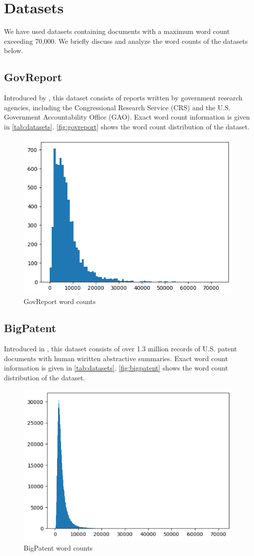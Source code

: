 \section{Datasets}
\label{sec:datasets}

We have used datasets containing documents with a maximum word count exceeding 70,000.
We briefly discuss and analyze the word counts of the datasets below.


\subsection*{GovReport}

Introduced by \citet{huang-etal-2021-efficient}, this dataset consists of reports written
by government research agencies, including the Congressional Research Service (CRS) and
the U.S. Government Accountability Office (GAO).
Exact word count information is given in \autoref{tab:datasets}.
\autoref{fig:govreport} shows the word count distribution of the dataset.

\begin{figure}[!ht]
	\centering
	\includegraphics[width=.48\textwidth]{Images/govreport-wordcount.png}
	\caption{GovReport word counts}
	\label{fig:govreport}
\end{figure}


\subsection*{BigPatent}

Introduced in \citet{sharma-etal-2019-bigpatent}, this dataset consists of over 1.3 million
records of U.S. patent documents with human wiritten abstractive summaries.
Exact word count information is given in \autoref{tab:datasets}.
\autoref{fig:bigpatent} shows the word count distribution of the dataset.

\begin{figure}[!ht]
	\centering
	\includegraphics[width=.48\textwidth]{Images/bigpatent-wordcount.png}
	\caption{BigPatent word counts}
	\label{fig:bigpatent}
\end{figure}

